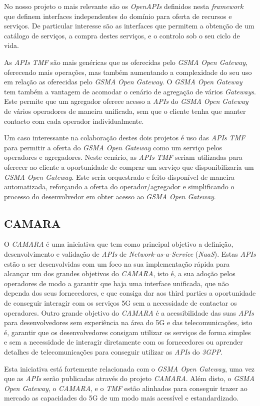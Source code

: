 No nosso projeto o mais relevante são os \emph{OpenAPIs} definidos nesta
\emph{framework} que definem interfaces independentes do domínio para oferta de
recursos e serviços. De particular interesse são as interfaces que permitem a
obtenção de um catálogo de serviços, a compra destes serviços, e o controlo sob
o seu ciclo de vida.

As \emph{APIs TMF} são mais genéricas que as oferecidas pelo \emph{GSMA Open
	Gateway}, oferecendo mais operações, mas também aumentando a complexidade do
seu uso em relação as oferecidas pelo \emph{GSMA Open Gateway}. O \emph{GSMA
	Open Gateway} tem também a vantagem de acomodar o cenário de agregação de
vários \emph{Gateways}. Este permite que um agregador oferece acesso a
\emph{APIs} do \emph{GSMA Open Gateway} de vários operadores de maneira
unificada, sem que o cliente tenha que manter contacto com cada operador
individualmente.

Um caso interessante na colaboração destes dois projetos é uso das \emph{APIs
	TMF} para permitir a oferta do \emph{GSMA Open Gateway} como um serviço pelos
operadores e agregadores. Neste cenário, as \emph{APIs TMF} seriam utilizadas
para oferecer ao cliente a oportunidade de comprar um serviço que
disponibilizaria um \emph{GSMA Open Gateway}. Este seria orquestrado e feito
disponível de maneira automatizada, reforçando a oferta do operador/agregador e
simplificando o processo do desenvolvedor em obter acesso ao \emph{GSMA Open
	Gateway}.

\subsection{CAMARA}


O \emph{CAMARA} é uma iniciativa que tem como principal objetivo a definição,
desenvolvimento e validação de \emph{APIs} de \emph{Network-as-a-Service}
(\emph{NaaS})\cite{10.1145/3538401.3546825}. Estas \emph{APIs} estão a ser
desenvolvidas com um foco na sua implementação rápida para alcançar um dos
grandes objetivos do \emph{CAMARA}, isto é, a sua adoção pelos operadores de
modo a garantir que haja uma interface unificada, que não dependa dos seus
fornecedores, e que consiga dar aos third parties a oportunidade de conseguir
interagir com os serviços 5G sem a necessidade de contactar os operadores.
Outro grande objetivo do \emph{CAMARA} é a acessibilidade das suas \emph{APIs}
para desenvolvedores sem experiência na área do 5G e das telecomunicações, isto
é, garantir que os desenvolvedores consigam utilizar os serviços de forma
simples e sem a necessidade de interagir diretamente com os fornecedores ou
aprender detalhes de telecomunicações para conseguir utilizar as \emph{APIs} do
\emph{3GPP}.

Esta iniciativa está fortemente relacionada com o \emph{GSMA Open Gateway}, uma
vez que as \emph{APIs} serão publicadas através do projeto
\emph{CAMARA}\cite{5gamericas}. Além disto, o \emph{GSMA Open Gateway}, o
\emph{CAMARA}, e o \emph{TMF} estão alinhados para conseguir trazer ao mercado
as capacidades do 5G de um modo mais acessível e estandardizado.
